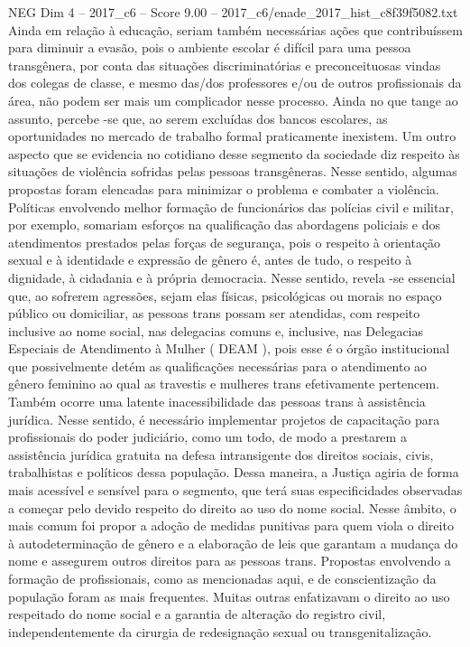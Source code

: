 \begin{textsample}{NEG Dim 4 – 2017\_c6 – Score 9.00 – 2017\_c6/enade\_2017\_hist\_c8f39f5082.txt}
Ainda em relação à educação, seriam também necessárias ações que contribuíssem para diminuir a evasão, pois o ambiente escolar é difícil para uma pessoa transgênera, por conta das situações discriminatórias e preconceituosas vindas dos colegas de classe, e mesmo das/dos professores e/ou de outros profissionais da área, não podem ser mais um complicador nesse processo.
Ainda no que tange ao assunto, percebe -se que, ao serem excluídas dos bancos escolares, as oportunidades no mercado de trabalho formal praticamente inexistem.
Um outro aspecto que se evidencia no cotidiano desse segmento da sociedade diz respeito às situações de violência sofridas pelas pessoas transgêneras.
Nesse sentido, algumas propostas foram elencadas para minimizar o problema e combater a violência.
Políticas envolvendo melhor formação de funcionários das polícias civil e militar, por exemplo, somariam esforços na qualificação das abordagens policiais e dos atendimentos prestados pelas forças de segurança, pois o respeito à orientação sexual e à identidade e expressão de gênero é, antes de tudo, o respeito à dignidade, à cidadania e à própria democracia.
Nesse sentido, revela -se essencial que, ao sofrerem agressões, sejam elas físicas, psicológicas ou morais no espaço público ou domiciliar, as pessoas trans possam ser atendidas, com respeito inclusive ao nome social, nas delegacias comuns e, inclusive, nas Delegacias Especiais de Atendimento à Mulher ( DEAM ), pois esse é o órgão institucional que possivelmente detém as qualificações necessárias para o atendimento ao gênero feminino ao qual as travestis e mulheres trans efetivamente pertencem.
Também ocorre uma latente inacessibilidade das pessoas trans à assistência jurídica.
Nesse sentido, é necessário implementar projetos de capacitação para profissionais do poder judiciário, como um todo, de modo a prestarem a assistência jurídica gratuita na defesa intransigente dos direitos sociais, civis, trabalhistas e políticos dessa população.
Dessa maneira, a Justiça agiria de forma mais acessível e sensível para o segmento, que terá suas especificidades observadas a começar pelo devido respeito do direito ao uso do nome social.
Nesse âmbito, o mais comum foi propor a adoção de medidas punitivas para quem viola o direito à autodeterminação de gênero e a elaboração de leis que garantam a mudança do nome e assegurem outros direitos para as pessoas trans.
Propostas envolvendo a formação de profissionais, como as mencionadas aqui, e de conscientização da população foram as mais frequentes.
Muitas outras enfatizavam o direito ao uso respeitado do nome social e a garantia de alteração do registro civil, independentemente da cirurgia de redesignação sexual ou transgenitalização.

\end{textsample}

